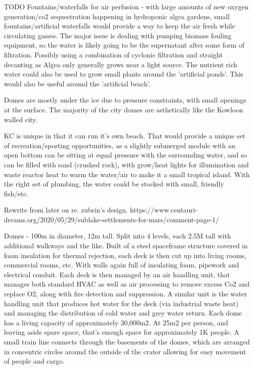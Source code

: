 \documentclass[10pt]{article}
\begin{document}
TODO Fountains/waterfalls for air perfusion - with large amounts of new oxygen generation/co2 sequestration happening in hydroponic algea gardens, small fountains/artificial waterfalls would provide a way to keep the air fresh while circulating gasses. The major issue is dealing with pumping biomass fouling equipment, so the water is likely going to be the supernatant after some form of filtration. Possibly using a combination of cyclonic filtration and straight decanting as Algea only generally grows near a light source. The nutrient rich water could also be used to grow small plants around the 'artificial ponds'. This would also be useful around the 'artificial beach'.


Domes are mostly under the ice due to pressure constraints, with small openings at the surface. The majority of the city domes are asthetically like the Kowloon walled city.

 KC is unique in that it can run it's own beach. That would provide a unique set of recreation/sporting opportunities, as a slightly submerged module with an open bottom can be sitting at equal pressure with the surrounding water, and so can be filled with sand (crushed rock), with grow/heat lights for illumination and waste reactor heat to warm the water/air to make it a small tropical island. With the right set of plumbing, the water could be stocked with small, friendly fish/etc.
 
 Rewrite from later on re. zubrin's design.
https://www.centauri-dreams.org/2020/05/29/sublake-settlements-for-mars/comment-page-1/

Domes - 100m in diameter, 12m tall. Split into 4 levels, each 2.5M tall with additional walkways and the like. Built of a steel spaceframe structure covered in foam insulation for thermal rejection, each deck is then cut up into living rooms, commercial rooms, etc. With walls again full of insulating foam, pipework and electrical conduit. Each deck is then managed by an air handling unit, that manages both standard HVAC as well as air processing to remove excess Co2 and replace O2, along with fire detection and suppression. A similar unit is the water handling unit that produces hot water for the deck (via industrial waste heat) and managing the distribution of cold water and grey water return. Each dome has a living capacity of approximately 30,000m2. At 25m2 per person, and leaving aside spare space, that's enough space for approximately 1K people. A small train line connects through the basements of the domes, which are arranged in concentric circles around the outside of the crater allowing for easy movement of people and cargo.
\end{document}
